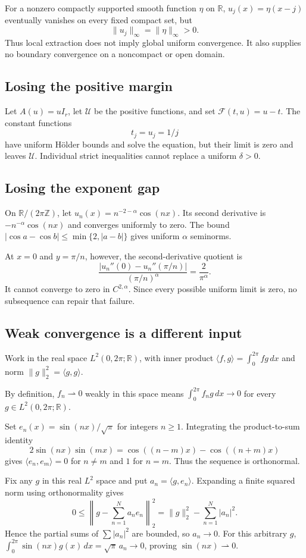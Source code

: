 \documentclass[12pt,reqno]{amsart}
\begin{document}
For a nonzero compactly supported smooth function $\eta$ on $\mathbb R$,
$u_j(x)=\eta(x-j)$ eventually vanishes on every fixed compact set, but
\[
 \|u_j\|_\infty=\|\eta\|_\infty>0.
\]
Thus local extraction does not imply global uniform convergence.
It also supplies no boundary convergence on a noncompact or open domain.

\subsection*{Losing the positive margin}
Let $A(u)=uI_r$, let $\mathcal U$ be the positive functions, and set
$\mathcal F(t,u)=u-t$. The constant functions
\[
 t_j=u_j=1/j
\]
have uniform H\"older bounds and solve the equation, but their limit
is zero and leaves $\mathcal U$. Individual strict inequalities cannot
replace a uniform $\delta>0$.

\subsection*{Losing the exponent gap}
On $\mathbb R/(2\pi\mathbb Z)$, let $u_n(x)=n^{-2-\alpha}\cos(nx)$.
Its second derivative is $-n^{-\alpha}\cos(nx)$ and converges uniformly
to zero. The bound $|\cos a-\cos b|\leq\min\{2,|a-b|\}$ gives uniform
$\alpha$ seminorms.

At $x=0$ and $y=\pi/n$, however, the second-derivative quotient is
\[
 \frac{|u_n''(0)-u_n''(\pi/n)|}{(\pi/n)^\alpha}
       =\frac{2}{\pi^\alpha}.
\]
It cannot converge to zero in $C^{2,\alpha}$. Since every possible
uniform limit is zero, no subsequence can repair that failure.

\subsection*{Weak convergence is a different input}
Work in the real space $L^2(0,2\pi;\mathbb R)$, with inner product
$\langle f,g\rangle=\int_0^{2\pi}fg\,dx$ and norm
$\|g\|_2^2=\langle g,g\rangle$.

By definition, $f_n\rightharpoonup0$ weakly in this space means
$\int_0^{2\pi}f_ng\,dx\to0$ for every $g\in L^2(0,2\pi;\mathbb R)$.

Set $e_n(x)=\sin(nx)/\sqrt\pi$ for integers $n\geq1$.
Integrating the product-to-sum identity
\[
 2\sin(nx)\sin(mx)=\cos((n-m)x)-\cos((n+m)x)
\]
gives $\langle e_n,e_m\rangle=0$ for $n\ne m$ and $1$ for $n=m$.
Thus the sequence is orthonormal.

Fix any $g$ in this real $L^2$ space and put $a_n=\langle g,e_n\rangle$.
Expanding a finite squared norm using orthonormality gives
\[
 0\leq\left\|g-\sum_{n=1}^N a_ne_n\right\|_2^2
       =\|g\|_2^2-\sum_{n=1}^N|a_n|^2.
\]
Hence the partial sums of $\sum|a_n|^2$ are bounded, so $a_n\to0$.
For this arbitrary $g$, $\int_0^{2\pi}\sin(nx)g(x)\,dx=\sqrt\pi\,a_n\to0$,
proving $\sin(nx)\rightharpoonup0$.
\end{document}

